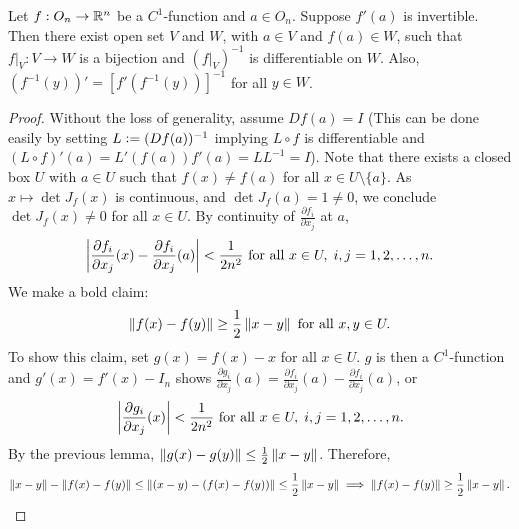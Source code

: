 \begin{theorem}
    Let $f:O_{n} \to \mathbb{R}^{n}$ be a $C^{1}$-function and $a \in O_{n}$. Suppose $f'(a)$ is invertible. Then there exist open set $V$ and $W$, with $a \in V$ and $f(a) \in W$, such that $f|_{V} : V \to W$ is a bijection and $(f|_{V})^{-1}$ is differentiable on $W$. Also, $(f^{-1}(y))' = [f'(f^{-1}(y))]^{-1}$ for all $y \in W$.
\end{theorem}
\begin{proof}
    Without the loss of generality, assume $Df(a) = I$ (This can be done easily by setting $L\vcentcolon= (Df(a))^{-1}$ implying $L \circ f$ is differentiable and $(L \circ f)'(a) = L'(f(a))f'(a) = L L^{-1} = I$). Note that there exists a closed box $U$ with $a \in U$ such that $f(x) \neq f(a)$ for all $x \in U \setminus \{a\}$. As $x \mapsto \det J_{f}(x)$ is continuous, and $\det J_{f}(a) = 1 \neq 0$, we conclude $\det J_{f}(x) \neq 0$ for all $x \in U$. By continuity of $\frac{\partial f_{i}}{\partial x_{j}}$ at $a$,
    \begin{align}
        \left| \frac{\partial f_{i}}{\partial x_{j}}(x) - \frac{\partial f_{i}}{\partial x_{j}}(a) \right| < \frac{1}{2n^{2}} \text{ for all } x \in U,\; i,j = 1,2,\ldots,n.
    \end{align}
    We make a bold claim:
    \begin{align}
        \left\lVert f(x)-f(y)\right\rVert \geq \frac{1}{2} \left\lVert x-y\right\rVert \text{ for all } x,y \in U.
    \end{align}
    To show this claim, set $g(x) = f(x) - x$ for all $x \in U$. $g$ is then a $C^{1}$-function and $g'(x) = f'(x)-I_{n}$ shows $\frac{\partial g_{i}}{\partial x_{j}}(a) = \frac{\partial f_{i}}{\partial x_{j}}(a) - \frac{\partial f_{i}}{\partial x_{j}}(a)$, or
    \begin{align}
        \left| \frac{\partial g_{i}}{\partial x_{j}}(x) \right| < \frac{1}{2n^{2}} \text{ for all } x \in U,\; i,j = 1,2,\ldots,n.
    \end{align}
    By the previous lemma, $\left\lVert g(x)-g(y)\right\rVert \leq \frac{1}{2} \left\lVert x-y\right\rVert$. Therefore,
    \begin{align}
        \left\lVert x-y\right\rVert -\left\lVert f(x)-f(y)\right\rVert \leq \left\lVert(x-y)-(f(x)-f(y))\right\rVert \leq \frac{1}{2}\left\lVert x-y\right\rVert \implies \left\lVert f(x)-f(y)\right\rVert \geq \frac{1}{2} \left\lVert x-y\right\rVert.
    \end{align}
\end{proof}